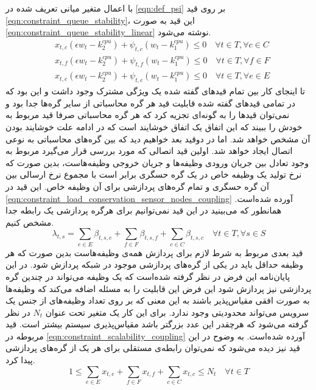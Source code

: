 	با اعمال متغیر میانی تعریف شده در \cref{eqn:def_psi} بر روی قید \cref{eqn:constraint_queue_stability}، این قید به صورت \cref{eqn:constraint_queue_stability_linear} نوشته می‌شود. 
	\begin{subequations}\label{eqn:constraint_queue_stability_linear}
		\begin{align}
			&x_{t,c}(\epsilon w_t - k_2^{cpu}) + \psi_{t,c}(w_t - k_1^{cpu}) \le 0 \quad \forall{t \in T}, \forall{c \in C} \\
			&x_{t,f}(\epsilon w_t - k_2^{cpu}) + \psi_{t,f}(w_t - k_1^{cpu}) \le 0 \quad \forall{t \in T}, \forall{f \in F} \\
			&x_{t,e}(\epsilon w_t - k_2^{cpu}) + \psi_{t,e}(w_t - k_1^{cpu}) \le 0 \quad \forall{t \in T}, \forall{e \in E}
		\end{align}
	\end{subequations}
	تا اینجای کار بین تمام قیدهای گفته شده یک ویژگی مشترک وجود داشت و این بود که در تمامی قیدهای گفته شده قابلیت قید هر گره محاسباتی از سایر گره‌ها جدا بود و نمی‌توان قیدها را به گونه‌ای تجزیه کرد که هر گره محاسباتی صرفا قید مربوط به خودش را ببیند که این اتفاق یک اتفاق خوشایند است که در ادامه علت خوشایند بودن آن مشخص خواهد شد. اما در دوقید بعد خواهیم دید که بین گره‌های محاسباتی به نوعی اتصال ایجاد خواهد شد. 
	اولین قید اتصالی که مورد بررسی قرار می‌گیرد مربوط به وجود تعادل بین جریان ورودی وظیفه‌ها و جریان خروجی وظیفه‌هاست، بدین صورت که نرخ تولید یک وظیفه خاص در یک گره‌ حسگری برابر است با مجموع نرخ ارسالی بین آن گره حسگری و تمام گره‌های پردازشی برای آن وظیفه خاص. این قید در \cref{eqn:constraint_load_conservation_sensor_nodes_coupling} آورده شده‌است. همانطور که می‌بینید در این قید نمی‌توانیم برای هرگره پردازشی یک رابطه جدا مشخص کنیم. 
	\begin{equation}\label{eqn:constraint_load_conservation_sensor_nodes_coupling}
	\lambda_{t,s} = \sum_{e \in E} \beta_{t,s,e} + \sum_{f 	\in F} \beta_{t,s,f}
	+\sum_{c \in C}\beta_{t,s,c} \quad \forall{t \in T}, \forall{s \in S}
	\end{equation} 
	قید بعدی مربوط به شرط لازم برای پردازش همه‌ی وظیفه‌هاست بدین صورت که هر وظیفه حداقل باید در یکی از گره‌های پردازشی موجود در شبکه پردازش شود. در این پایان‌نامه این فرض در نظر گرفته شده‌است که یک وظیفه می‌تواند در چندین گره پردازشی نیز پردازش شود این فرض این قابلیت را به مسئله اضافه می‌کند که وظیفه‌ها به صورت افقی مقیاس‌پذیر باشند به این معنی که بر روی تعداد وظیفه‌های از جنس یک سرویس می‌تواند محدودیتی وجود ندارد. برای این کار یک متغیر تحت عنوان $N_t$ در نظر گرفته می‌شود که هرچقدر این عدد بزرگتر باشد مقیاس‌پذیری سیستم بیشتر است. قید مربوطه در \cref{eqn:constraint_scalability_coupling} آورده شده‌است. به وضوح در این قید نیز دیده می‌شود که نمی‌توان رابطه‌ی مستقلی برای هر یک از گره‌های پردازشی پیدا کرد. 
	\begin{equation}\label{eqn:constraint_scalability_coupling}
		1 \le \sum_{e \in E}x_{t,e} + \sum_{f \in F}x_{t,f} + \sum_{c \in C}x_{t,c} \le N_t \quad \forall{t \in T}
	\end{equation}
